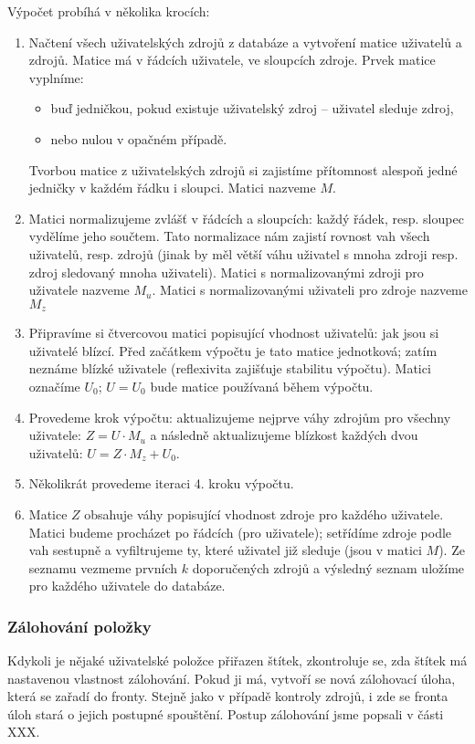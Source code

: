 Výpočet probíhá v několika krocích:
\begin{enumerate}
	\item Načtení všech uživatelských zdrojů z databáze a vytvoření matice uživatelů a zdrojů.
		Matice má v řádcích uživatele, ve sloupcích zdroje.
		Prvek matice vyplníme:
		\begin{itemize}
			\item buď jedničkou, pokud existuje uživatelský zdroj – uživatel sleduje zdroj,
			\item nebo nulou v opačném případě.
		\end{itemize}
		Tvorbou matice z uživatelských zdrojů si zajistíme přítomnost alespoň jedné jedničky v každém řádku i sloupci.
		Matici nazveme $M$.
	\item Matici normalizujeme zvlášť v řádcích a sloupcích: každý řádek, resp. sloupec vydělíme jeho součtem.
		Tato normalizace nám zajistí rovnost vah všech uživatelů, resp. zdrojů (jinak by měl větší váhu uživatel s mnoha zdroji resp. zdroj sledovaný mnoha uživateli).
		Matici s normalizovanými zdroji pro uživatele nazveme $M_u$.
		Matici s normalizovanými uživateli pro zdroje nazveme $M_z$
	\item Připravíme si čtvercovou matici popisující vhodnost uživatelů: jak jsou si uživatelé blízcí.
		Před začátkem výpočtu je tato matice jednotková; zatím neznáme blízké uživatele (reflexivita zajišťuje stabilitu výpočtu).
		Matici označíme $U_0$; $U = U_0$ bude matice používaná během výpočtu.
	\item Provedeme krok výpočtu:
		aktualizujeme nejprve váhy zdrojům pro všechny uživatele:
			$ Z = U \cdot M_u $
		a následně aktualizujeme blízkost každých dvou uživatelů:
			$ U = Z \cdot M_z + U_0 $.
	\item Několikrát provedeme iteraci 4. kroku výpočtu.
	\item Matice $Z$ obsahuje váhy popisující vhodnost zdroje pro každého uživatele.
		Matici budeme procházet po řádcích (pro uživatele); setřídíme zdroje podle vah sestupně a vyfiltrujeme ty, které uživatel již sleduje (jsou v matici $M$).
		Ze seznamu vezmeme prvních $k$ doporučených zdrojů a výsledný seznam uložíme pro každého uživatele do databáze.
\end{enumerate}

\subsubsection{Zálohování položky}

Kdykoli je nějaké uživatelské položce přiřazen štítek, zkontroluje se, zda štítek má nastavenou vlastnost zálohování.
Pokud ji má, vytvoří se nová zálohovací úloha, která se zařadí do fronty.
Stejně jako v případě kontroly zdrojů, i zde se fronta úloh stará o jejich postupné spouštění.
Postup zálohování jsme popsali v části XXX. %

